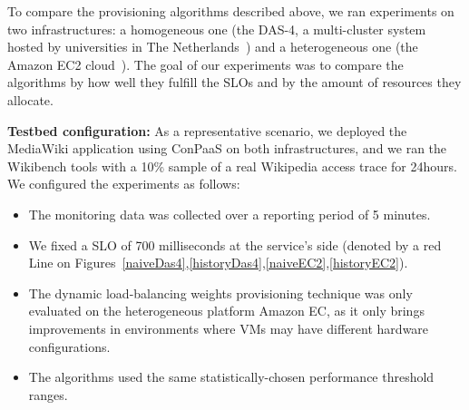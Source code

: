 To compare the provisioning algorithms described above, we ran experiments
on two infrastructures: a homogeneous one (the DAS-4, a multi-cluster system
hosted by universities in The Netherlands~\cite{das4}) and a heterogeneous
one (the Amazon EC2 cloud~\cite{amazonEC2}). The goal of our experiments
was to compare the algorithms by how well they fulfill the SLOs and by
the amount of resources they allocate.



\textbf{Testbed configuration:}  As a representative scenario, we deployed the MediaWiki application using ConPaaS on both infrastructures, and we ran the Wikibench tools with a 10\% sample of a real Wikipedia access trace for 24hours. 
We configured the experiments as follows:

\begin{itemize}

\item The monitoring data was collected over a reporting period of 5 minutes.

\item We fixed a SLO of 700 milliseconds at the service's side (denoted by a red Line on Figures~\ref{naiveDas4},\ref{historyDas4},\ref{naiveEC2},\ref{historyEC2}).


\item The dynamic load-balancing weights provisioning technique was only evaluated on the heterogeneous platform Amazon EC, as it only brings improvements in environments where VMs may have different hardware configurations. 

\item The algorithms used the same statistically-chosen performance threshold ranges. 

\end{itemize}


